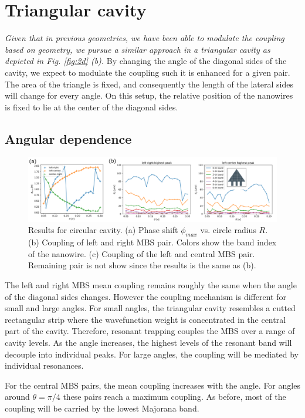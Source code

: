 \section{Triangular cavity}

\textit{Given that in previous geometries, we have been able to modulate the coupling based on geometry, we pursue a similar approach in a triangular cavity as depicted in Fig. \ref{fig:2d} (b).}
By changing the angle of the diagonal sides of the cavity, we expect to modulate the coupling such it is enhanced for a given pair.
The area of the triangle is fixed, and consequently the length of the lateral sides will change for every angle.
On this setup, the relative position of the nanowires is fixed to lie at the center of the diagonal sides.

\subsection{Angular dependence}

\begin{figure}[h!]
\centering
  \includegraphics[width=0.8\linewidth]{figures/triangle_one_side_results.pdf}
  \caption{Results for circular cavity. (a) Phase shift $\phi_{max}$ vs. circle radius $R$. (b) Coupling of left and right MBS pair. Colors show the band index of the nanowire. (c) Coupling of the left and central MBS pair. Remaining pair is not show since the results is the same as (b).}
  \label{fig:average_ring_coupling}
\end{figure}

The left and right MBS mean coupling remains roughly the same when the angle of the diagonal sides changes.
However the coupling mechanism is different for small and large angles.
For small angles, the triangular cavity resembles a cutted rectangular strip where the wavefunction weight is concentrated in the central part of the cavity.
Therefore, resonant trapping couples the MBS over a range of cavity levels.
As the angle increases, the highest levels of the resonant band will decouple into individual peaks.
For large angles, the coupling will be mediated by individual resonances.

For the central MBS pairs, the mean coupling increases with the angle.
For angles around $\theta=\pi/4$ these pairs reach a maximum coupling.
As before, most of the coupling will be carried by the lowest Majorana band.


